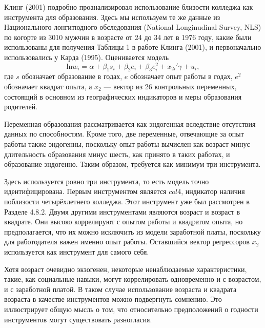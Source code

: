 Клинг (2001) подробно проанализировал использование близости колледжа как инструмента для образования. Здесь мы используем те же данные из Национального лонгитюдного обследования (National Longinudinal Survey, NLS) по когорте из 3010 мужчин в возрасте от 24 до 34 лет в 1976 году, какие были использованы для получения Таблицы 1 в работе Клинга (2001), и первоначально использовались у Карда (1995). Оценивается модель
$$
\mathrm{ln} w_i = \alpha + \beta_1 s_i + \beta_2 e_i + \beta_3 e_i^2 + x_{2i}'\gamma+u_i,
$$
где $s$ обозначает образование в годах, $e$ обозначает опыт работы в годах, $e^2$ обозначает квадрат опыта, а $x_2$ --- вектор из 26 контрольных переменных, состоящий в основном из географических индикаторов и меры образования родителей.

Переменная образования рассматривается как эндогенная вследствие отсутствия данных по способностям. Кроме того, две переменные, отвечающие за опыт работы также эндогенны, поскольку опыт работы вычислен как возраст минус длительность образования минус шесть, как принято в таких работах, и образование эндогенно. Таким образом, требуется как минимум три инструмента.

Здесь используется ровно три инструмента, то есть модель точно идентифицирована. Первым инструментом является $col4$, индикатор наличия поблизости четырёхлетнего колледжа. Этот инструмент уже был рассмотрен в Разделе 4.8.2. Двумя другими инструментами являются возраст и возраст в квадрате. Они высоко коррелируют с опытом работы и квадратом опыта, но предполагается, что их можно исключить из модели заработной платы, поскольку для работодателя важен именно опыт работы. Оставшийся вектор регрессоров $x_2$ используется как инструмент для самого себя. 

Хотя возраст очевидно экзогенен, некоторые ненаблюдаемые характеристики, такие, как социальные навыки, могут коррелировать одновременно и с возрастом, и с заработной платой. В таком случае использование возраста и квадрата возраста в качестве инструментов можно подвергнуть сомнению. Это иллюстрирует общую мысль о том, что относительно предположений о годности инструментов могут существовать разногласия.

